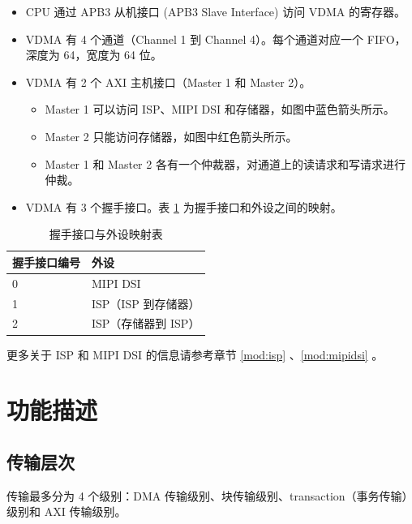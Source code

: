 \documentclass[main\_\_CN.tex]{subfiles}
\begin{document}
\begin{itemize}
    \item CPU 通过 APB3 从机接口 (APB3 Slave Interface) 访问 VDMA 的寄存器。
    \item VDMA 有 4 个通道（Channel 1 到 Channel 4）。每个通道对应一个 FIFO，深度为 64，宽度为 64 位。
    \item VDMA 有 2 个 AXI 主机接口（Master 1 和 Master 2）。
        \begin{itemize}
            \item Master 1 可以访问 ISP、MIPI DSI 和存储器，如图中蓝色箭头所示。
            \item Master 2 只能访问存储器，如图中红色箭头所示。
            \item Master 1 和 Master 2 各有一个仲裁器，对通道上的读请求和写请求进行仲裁。
        \end{itemize}
    \item VDMA 有 3 个握手接口。表 \ref{tab:VDMA-hw-hs} 为握手接口和外设之间的映射。
\end{itemize}

\begin{longtable}{ | p{6.8cm} | p{5.2cm} | }
\caption{握手接口与外设映射表}
\label{tab:VDMA-hw-hs} \\
\hline
\rowcolor{lightgray}
\textbf{握手接口编号} & \textbf{外设} \\ \hline
0 & MIPI DSI  \\ \hline
1 & ISP（ISP 到存储器） \\ \hline
2 & ISP（存储器到 ISP） \\ \hline
\end{longtable}

更多关于 ISP 和 MIPI DSI 的信息请参考章节 \ref{mod:isp} \textit{}、\ref{mod:mipidsi} \textit{}。

\section{功能描述}

\subsection{传输层次}
\label{sec:vdma-transfer-hierarchy}

传输最多分为 4 个级别：DMA 传输级别、块传输级别、transaction（事务传输）级别和 AXI 传输级别。
\end{document}
